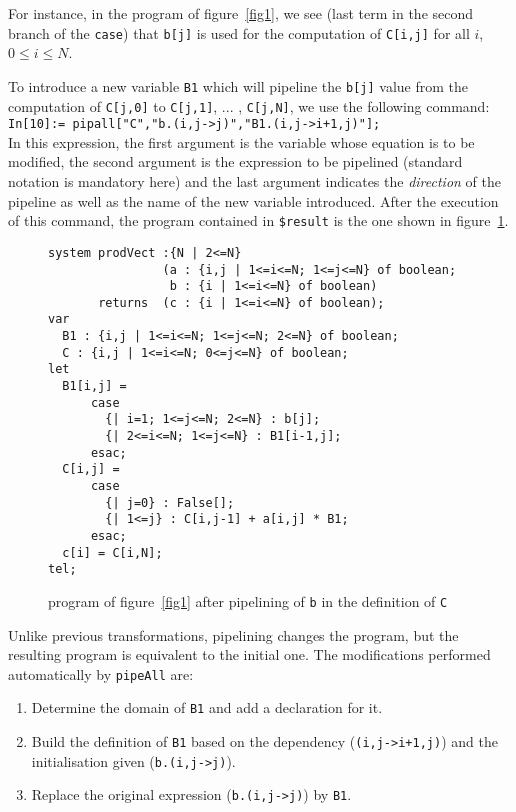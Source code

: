 For instance, in the program of figure~\ref{fig1}, we see (last 
term in the second branch of the {\tt case}) that 
{\tt b[j]} is used for the computation of {\tt C[i,j]} 
for all $i$, $0\leq i \leq N$. 

To introduce a new variable {\tt B1} which will pipeline the {\tt b[j]} 
value from the computation of {\tt C[j,0]} to 
{\tt C[j,1]}, ... , {\tt C[j,N]}, we
use the following command:\\
{\tt In[10]:= pipall["C","b.(i,j->j)","B1.(i,j->i+1,j)"]; }\\
In this expression, the first argument is the variable whose
equation is to be modified, the second argument is the
expression to be pipelined (standard notation is mandatory here)
and the last argument indicates the {\em direction} of the pipeline
as well as the name of the new variable introduced. 
After the
execution of this command, the program contained in {\tt \$result} is
the one shown in figure~\ref{fig2}.

\begin{figure}[ht]
\begin{verbatim}
system prodVect :{N | 2<=N}
                (a : {i,j | 1<=i<=N; 1<=j<=N} of boolean; 
                 b : {i | 1<=i<=N} of boolean)
       returns  (c : {i | 1<=i<=N} of boolean);
var
  B1 : {i,j | 1<=i<=N; 1<=j<=N; 2<=N} of boolean;
  C : {i,j | 1<=i<=N; 0<=j<=N} of boolean;
let
  B1[i,j] = 
      case
        {| i=1; 1<=j<=N; 2<=N} : b[j];
        {| 2<=i<=N; 1<=j<=N} : B1[i-1,j];
      esac;
  C[i,j] = 
      case
        {| j=0} : False[];
        {| 1<=j} : C[i,j-1] + a[i,j] * B1;
      esac;
  c[i] = C[i,N];
tel;
\end{verbatim}
\caption{{\Alpha} program of figure~\ref{fig1} after pipelining of {\tt b}
in the definition of \texttt{C}}
\label{fig2}
\end{figure}

Unlike previous transformations, pipelining changes the
{\Alpha} program, but the resulting program is equivalent to
the initial one. 
The modifications performed automatically by \texttt{pipeAll} are:
\begin{enumerate}
\item Determine the domain of {\tt B1} and add a
declaration for it.
\item Build the definition of {\tt B1} based on the dependency ({\tt (i,j->i+1,j)}) and the initialisation given ({\tt b.(i,j->j)}).
\item Replace the original expression ({\tt b.(i,j->j)}) by {\tt B1}.
\end{enumerate}

